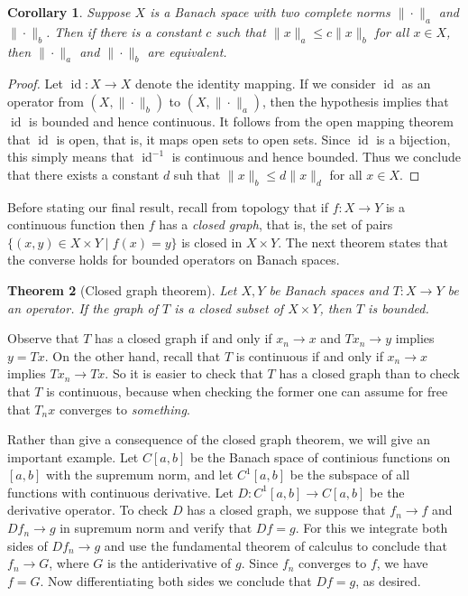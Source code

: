 \documentclass[11pt,oneside]{amsbook}
\DeclareMathOperator{\id}{id}
\theoremstyle{definition}
\theoremstyle{plain}
\newtheorem{thm}{Theorem}[section]
\newtheorem{cor}[thm]{Corollary}
\theoremstyle{definition}
\theoremstyle{remark}
\numberwithin{equation}{section}
\numberwithin{figure}{section}
\begin{document}
\begin{cor}
  Suppose $X$ is a Banach space with two complete norms $\|\cdot\|_a$ and $\|\cdot\|_b$. Then if there is a constant $c$ such that $\|x\|_a\leq c\|x\|_b$ for all $x\in X$, then $\|\cdot\|_a$ and $\|\cdot\|_b$ are equivalent.
\end{cor}

\begin{proof}
  Let $\id\colon X\to X$ denote the identity mapping. If we consider $\id$ as an operator from $(X,\|\cdot\|_b)$ to $(X,\|\cdot\|_a)$, then the hypothesis implies that $\id$ is bounded and hence continuous. It follows from the open mapping theorem that $\id$ is open, that is, it maps open sets to open sets. Since $\id$ is a bijection, this simply means that $\id^{-1}$ is continuous and hence bounded. Thus we conclude that there exists a constant $d$ suh that $\|x\|_b\leq d\|x\|_d$ for all $x\in X$.
\end{proof}

Before stating our final result, recall from topology that if $f\colon X\to Y$ is a continuous function then $f$ has a \emph{closed graph}, that is, the set of pairs $\{(x,y)\in X\times Y\mid f(x)=y\}$ is closed in $X\times Y$. The next theorem states that the converse holds for bounded operators on Banach spaces.

\begin{thm}[Closed graph theorem]
  Let $X,Y$ be Banach spaces and $T\colon X\to Y$ be an operator. If the graph of $T$ is a closed subset of $X\times Y$, then $T$ is bounded.
\end{thm}

Observe that $T$ has a closed graph if and only if $x_n\to x$ and $Tx_n\to y$ implies $y=Tx$. On the other hand, recall that $T$ is continuous if and only if $x_n\to x$ implies $Tx_n\to Tx$.  So it is easier to check that $T$ has a closed graph than to check that $T$ is continuous, because when checking the former one can assume for free that $T_nx$ converges to \emph{something}.

Rather than give a consequence of the closed graph theorem, we will give an important example. Let $C[a,b]$ be the Banach space of continious functions on $[a,b]$ with the supremum norm, and let $C^1[a,b]$ be the subspace of all functions with continuous derivative. Let $D\colon C^1[a,b]\to C[a,b]$ be the derivative operator. To check $D$ has a closed graph, we suppose that $f_n\to f$ and $Df_n\to g$ in supremum norm and verify that $Df=g$. For this we integrate both sides of $Df_n\to g$ and use the fundamental theorem of calculus to conclude that $f_n\to G$, where $G$ is the antiderivative of $g$. Since $f_n$ converges to $f$, we have $f=G$. Now differentiating both sides we conclude that $Df=g$, as desired.
\end{document}
